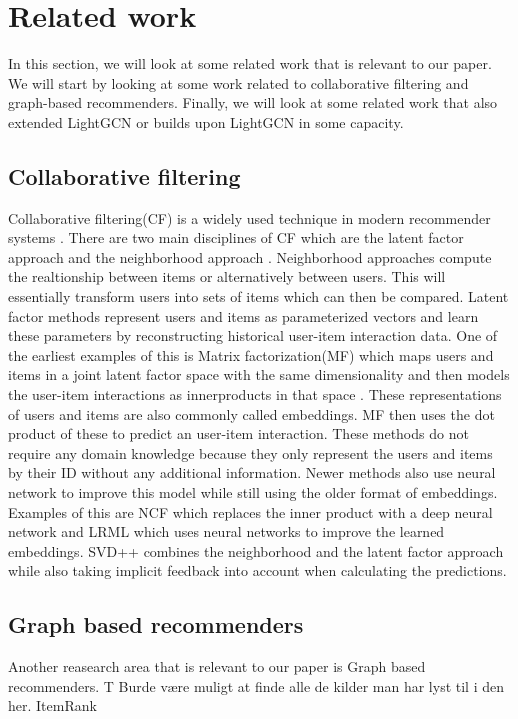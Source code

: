 \section{Related work}
In this section, we will look at some related work that is relevant to our paper.
We will start by looking at some work related to collaborative filtering and graph-based recommenders.
Finally, we will look at some related work that also extended LightGCN or builds upon LightGCN in some capacity.

\subsection{Collaborative filtering}
Collaborative filtering(CF) is a widely used technique in modern recommender systems \cite{lightgcn}.
There are two main disciplines of CF which are the latent factor approach and the neighborhood approach \cite{SVD}.
Neighborhood approaches compute the realtionship between items or alternatively between users.
This will essentially transform users into sets of items which can then be compared.
Latent factor methods represent users and items as parameterized vectors and learn these parameters by reconstructing historical user-item interaction data.
One of the earliest examples of this is Matrix factorization(MF) which maps users and items in a joint latent factor space with the same dimensionality and then models the user-item interactions as innerproducts in that space \cite{Matrix-factorization-techniques}.
These representations of users and items are also commonly called embeddings.
MF then uses the dot product of these to predict an user-item interaction.
These methods do not require any domain knowledge because they only represent the users and items by their ID without any additional information.
Newer methods also use neural network to improve this model while still using the older format of embeddings. 
Examples of this are NCF \cite{NCF} which replaces the inner product with a deep neural network and LRML\cite{LRML} which uses neural networks to improve the learned embeddings.
SVD++ \cite{SVD} combines the neighborhood and the latent factor approach while also taking implicit feedback into account when calculating the predictions.

\subsection{Graph based recommenders}
Another reasearch area that is relevant to our paper is Graph based recommenders.
T
Burde være muligt at finde alle de kilder man har lyst til i den her. 
ItemRank

